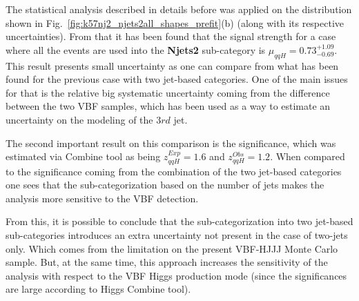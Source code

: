 The statistical analysis described in details before was applied on the distribution shown in Fig.~\ref{fig:k57nj2_njets2all_shapes_prefit}(b) (along with its respective uncertainties). From that it has been found that the signal strength for a case where all the events are used into the \textbf{Njets2} sub-category is $\mu_{qqH} = 0.73_{-0.69}^{+1.09}$. This result presents small uncertainty as one can compare from what has been found for the previous case with two jet-based categories. One of the main issues for that is the relative big systematic uncertainty coming from the difference between the two VBF samples, which has been used as a way to estimate an uncertainty on the modeling of the 3$rd$ jet.

The second important result on this comparison is the significance, which was estimated via Combine tool as being $z_{qqH}^{Exp} = 1.6$ and $z_{qqH}^{Obs} = 1.2$. When compared to the significance coming from the combination of the two jet-based categories one sees that the sub-categorization based on the number of jets makes the analysis more sensitive to the VBF detection. 

From this, it is possible to conclude that the sub-categorization into two jet-based sub-categories introduces an extra uncertainty not present in the case of two-jets only. Which comes from the limitation on the present VBF-HJJJ Monte Carlo sample. But, at the same time, this approach increases the sensitivity of the analysis with respect to the VBF Higgs production mode (since the significances are large according to Higgs Combine tool).